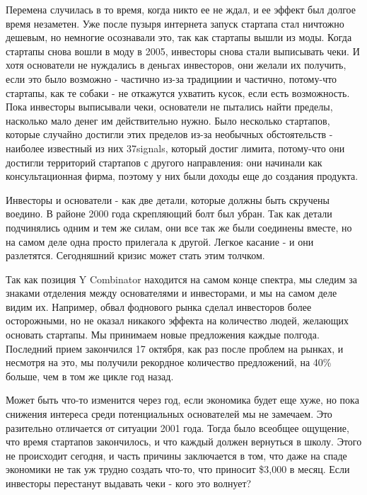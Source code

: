 \documentclass[ebook,12pt,oneside,openany]{memoir}
\begin{document}
Перемена случилась в то время, когда никто ее не ждал, и ее эффект был
долгое время незаметен. Уже после пузыря интернета запуск стартапа
стал ничтожно дешевым, но немногие осознавали это, так как стартапы
вышли из моды. Когда стартапы снова вошли в моду в 2005, инвесторы
снова стали выписывать чеки. И хотя основатели не нуждались в деньгах
инвесторов, они желали их получить, если это было возможно - частично
из-за традициии и частично, потому-что стартапы, как те собаки - не
откажутся ухватить кусок, если есть возможность. Пока инвесторы
выписывали чеки, основатели не пытались найти пределы, насколько мало
денег им действительно нужно. Было несколько стартапов, которые
случайно достигли этих пределов из-за необычных обстоятельств -
наиболее известный из них 37signals, который достиг лимита, потому-что
они достигли территорий стартапов с другого направления: они начинали
как консультационная фирма, поэтому у них были доходы еще до создания
продукта.

Инвесторы и основатели - как две детали, которые должны быть скручены
воедино. В районе 2000 года скрепляющий болт был убран. Так как детали
подчинялись одним и тем же силам, они все так же были соединены
вместе, но на самом деле одна просто прилегала к другой. Легкое
касание - и они разлетятся. Сегодняшний кризис может стать этим
толчком.

Так как позиция Y Combinator находится на самом конце спектра, мы
следим за знаками отделения между основателями и инвесторами, и мы на
самом деле видим их. Например, обвал фоднового рынка сделал инвесторов
более осторожными, но не оказал никакого эффекта на количество людей,
желающих основать стартапы. Мы принимаем новые предложения каждые
полгода. Последний прием закончился 17 октября, как раз после проблем
на рынках, и несмотря на это, мы получили рекордное количество
предложений, на 40\% больше, чем в том же цикле год назад.

Может быть что-то изменится через год, если экономика будет еще хуже,
но пока снижения интереса среди потенциальных основателей мы не
замечаем. Это разительно отличается от ситуации 2001 года. Тогда было
всеобщее ощущение, что время стартапов закончилось, и что каждый
должен вернуться в школу. Этого не происходит сегодня, и часть причины
заключается в том, что даже на спаде экономики не так уж трудно
создать что-то, что приносит \$3,000 в месяц. Если инвесторы
перестанут выдавать чеки - кого это волнует?
\end{document}
